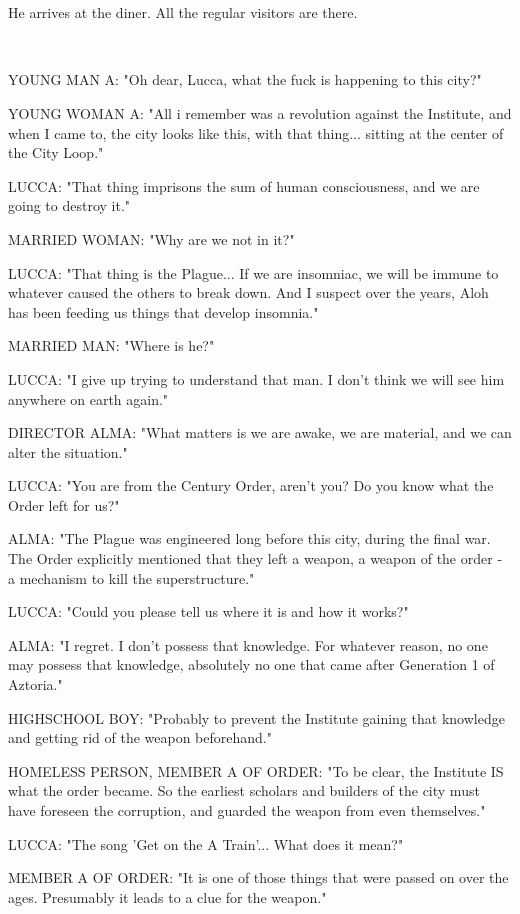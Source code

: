 \documentclass[11pt]{article}
\begin{document}
\ 

\ 

He arrives at the diner.
All the regular visitors are there. 

\ 

YOUNG MAN A: "Oh dear, Lucca, what the fuck is happening to this city?"

YOUNG WOMAN A: "All i remember was a revolution against the Institute, and when I came to, the city looks like this, with that thing... sitting at the center of the City Loop."

LUCCA: "That thing imprisons the sum of human consciousness, and we are going to destroy it."

MARRIED WOMAN: "Why are we not in it?"

LUCCA: "That thing is the Plague... If we are insomniac, we will be immune to whatever caused the others to break down.
And I suspect over the years, Aloh has been feeding us things that develop insomnia."

MARRIED MAN: "Where is he?"

LUCCA: "I give up trying to understand that man.
I don't think we will see him anywhere on earth again."

DIRECTOR ALMA: "What matters is we are awake, we are material, and we can alter the situation."

LUCCA: "You are from the Century Order, aren't you? 
Do you know what the Order left for us?"

ALMA: "The Plague was engineered long before this city, during the final war. 
The Order explicitly mentioned that they left a weapon, a weapon of the order - a mechanism to kill the superstructure."

LUCCA: "Could you please tell us where it is and how it works?"

ALMA: "I regret. I don't possess that knowledge. For whatever reason, no one may possess that knowledge, absolutely no one that came after Generation 1 of Aztoria."

HIGHSCHOOL BOY: "Probably to prevent the Institute gaining that knowledge and getting rid of the weapon beforehand."

HOMELESS PERSON, MEMBER A OF ORDER: "To be clear, the Institute IS what the order became. 
So the earliest scholars and builders of the city must have foreseen the corruption, and guarded the weapon from even themselves."

LUCCA: "The song 'Get on the A Train'... What does it mean?"

MEMBER A OF ORDER: "It is one of those things that were passed on over the ages. 
Presumably it leads to a clue for the weapon."
\end{document}
